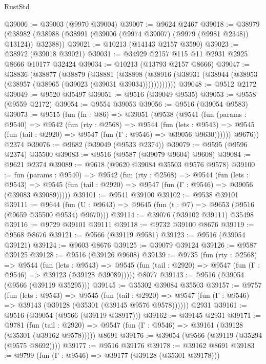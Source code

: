 \begin{lexlean}{RustStd}
\begin{coremodule}
@39006 := @39003 (@9970 @39004)
@39007 := @9624 @2467
@39018 := @38979
    (@38982 (@38988 (@38991 (@39006 (@9974 @39007) (@9979 (@9981 @2348)) @13124)) @32388))
@39021 := @10213 (@14143 @2157 @3590)
@39023 := @38972 (@39018 @39021)
@39031 := @34929 @2157 @115 @11 @2931 @2925 @8666 @10177 @32424
@39034 := @10213 (@13793 @2157 @8666)
@39047 := @38836
    (@38877
      (@38879
        (@38881
          (@38898 (@38916 (@38931 (@38944 (@38953 (@38957 (@38965 (@39023 (@39031 @39034))))))))))))
@39048 := @9512 @2172
@39049 := @9520 @35497
@39051 := @9516 (@39049 @9535)
@39053 := @9558 (@9559 @2172)
@39054 := @9554 @39053
@39056 := @9516 (@39054 @9583)
@39073 := @9515
    (fun (fn : @86) =>
    @39051
      (@9538
        (@9541
          (fun (params : @9540) =>
          @9542
            (fun (rty : @2568) =>
            @9544
              (fun (lets : @9543) =>
              @9545 (fun (tail : @2920) => @9547 (fun (Γ : @9546) => @39056 @9630))))))
        @9676))
    @2374
@39076 := @9682 (@39049 (@9533 @2374))
@39079 := @9595 (@9596 @2374) @35500
@39083 := @9516 (@9587 (@39079 @9604) @9608)
@39084 := @9621 @2374
@39089 := @9618 (@9620 @39084 @35503 @9576 @9578)
@39100 := fun (params : @9540) =>
  @9542
    (fun (rty : @2568) =>
    @9544
      (fun (lets : @9543) =>
      @9545 (fun (tail : @2920) => @9547 (fun (Γ : @9546) => @39056 (@39083 @39089)))))
@39101 := @9541 @39100
@39102 := @9538 @39101
@39111 := @9644
    (fun (U : @9643) => @9645 (fun (t : @7) => @9653 (@9516 (@9659 @35500 @9534) @9670)))
@39114 := @39076 (@39102 @39111) @35498
@39116 := @9729 @39101 @39111
@39118 := @9732 @39100 @8676
@39119 := @9568 @8676
@39121 := @9566 (@39119 @9581)
@39123 := @9516 (@39054 @39121)
@39124 := @9603 @8676
@39125 := @39079 @39124
@39126 := @9587 @39125
@39128 := @9516 (@39126 @9608)
@39139 := @9735
    (fun (rty : @2568) =>
    @9544
      (fun (lets : @9543) =>
      @9545 (fun (tail : @2920) => @9547 (fun (Γ : @9546) => @39123 (@39128 @39089)))))
    @8077
@39143 := @9516 (@39054 (@9566 (@39119 @35295)))
@39145 := @35302 @39084 @35503
@39157 := @9757
    (fun (lets : @9543) =>
    @9545
      (fun (tail : @2920) =>
      @9547 (fun (Γ : @9546) => @39143 (@39128 (@35301 (@39145 @9576 @9578))))))
    @2931
@39161 := @9516 (@39054 (@9566 (@39119 @38917)))
@39162 := @39145 @2931
@39171 := @9781
    (fun (tail : @2920) => @9547 (fun (Γ : @9546) => @39161 (@39128 (@35301 (@39162 @9578)))))
    @8691
@39176 := @39054 (@9566 (@39119 (@35294 (@9575 @8692))))
@39177 := @9516 @39176
@39178 := @39162 @8691
@39183 := @9799 (fun (Γ : @9546) => @39177 (@39128 (@35301 @39178)))

\end{coremodule}
\end{lexlean}
